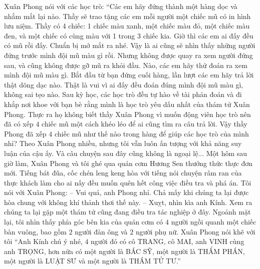 	\vskip 0.1cm
	\textbf{\color{toancuabi}{Chiếc mũ kỷ niệm}}
	\vskip 0.1cm
	Xuân Phong nói với các học trò: “Các em hãy đứng thành một hàng dọc và nhắm mắt lại nào. Thầy sẽ trao tặng các em mỗi người một chiếc mũ có in hình lưu niệm. Thầy có 4 chiếc: 1 chiếc màu xanh, một chiếc màu đỏ, một chiếc màu đen, và một chiếc có cùng màu với 1 trong 3 chiếc kia. Giờ thì các em ai đấy đều có mũ rồi đấy. Chuẩn bị mở mắt ra nhé. Vậy là ai cũng sẽ nhìn thấy những người đứng trước mình đội mũ màu gì rồi. Nhưng không được quay ra xem người đứng sau, và cũng không được gỡ mũ ra khỏi đầu. Nào, các em hãy thử đoán ra xem mình đội mũ màu gì. Bắt đầu từ bạn đứng cuối hàng, lần lượt các em hãy trả lời thật dõng dạc nào. 
	\vskip 0.1cm
	Thật là vui vì ai đấy đều đoán đúng mình đội mũ màu gì, không sai tẹo nào. Sau kỳ học, các học trò đều tự hào về tài phán đoán và đi khắp nơi khoe với bạn bè rằng mình là học trò yêu dấu nhất của thám tử Xuân Phong. Thực ra họ không biết thầy Xuân Phong vì muốn động viên học trò nên đã có xếp $4$ chiếc mũ một cách khéo léo để ai cũng tìm ra câu trả lời. 
	\vskip 0.1cm
	Vậy thầy Phong đã xếp $4$ chiếc mũ như thế nào trong hàng để giúp các học trò của mình nhỉ? 
	\vskip 0.1cm
	Theo Xuân Phong nhiều, nhưng tôi vẫn luôn ấn tượng với khả năng suy luận của cậu ấy. Và câu chuyện sau đây cũng không là ngoại lệ...
	\vskip 0.1cm
	\textbf{\color{toancuabi}{Vị thám tử ẩn danh}}
	\vskip 0.1cm
	Một hôm sau giờ làm, Xuân Phong và tôi ghé qua quán cơm Hương Sen thưởng thức thực đơn mới. Tiếng bát đũa, cốc chén leng keng hòa với tiếng nói chuyện râm ran của thực khách làm cho ai nấy đều muốn quên hết công việc điều tra và phá án. 
	\vskip 0.1cm
	Tôi nói với Xuân Phong: 
	\vskip 0.1cm
	-- Vui quá, anh Phong nhỉ. Chả mấy khi chúng ta lại được hòa chung với không khí thảnh thơi thế này. 
	\vskip 0.1cm
	-- Xuỵt, nhìn kìa anh Kính. Xem ra chúng ta lại gặp một thám tử cũng đang điều tra tác nghiệp ở đây. 
	\vskip 0.1cm
	Ngoảnh mặt lại, tôi nhìn thấy phía góc bên kia của quán cơm có $4$ người ngồi quanh một chiếc bàn vuông, bao gồm $2$ người đàn ông và $2$ người phụ nữ. Xuân Phong nói khẽ với tôi “Anh Kính chú ý nhé, $4$ người đó có cô TRANG, cô MAI, anh VINH cùng anh TRỌNG, hơn nữa có một người là BÁC SỸ, một người là THẨM PHÁN, một người là LUẬT SƯ và một người là THÁM TỬ TƯ.” 
